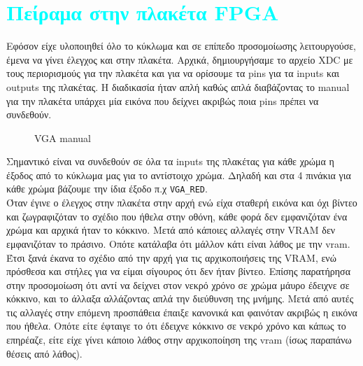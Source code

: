 \documentclass[12pt,a4paper]{article}
\begin{document}
	\section{\textcolor{cyan}{Πείραμα στην πλακέτα FPGA}}
	
	Εφόσον είχε υλοποιηθεί όλο το κύκλωμα και σε επίπεδο προσομοίωσης λειτουργούσε, έμενα να γίνει έλεγχος και στην πλακέτα. Αρχικά, δημιουργήσαμε το αρχείο XDC με τους περιορισμούς για την πλακέτα και για να ορίσουμε τα pins για τα inputs και outputs της πλακέτας. Η διαδικασία ήταν απλή καθώς απλά διαβάζοντας το manual για την πλακέτα υπάρχει μία εικόνα που δείχνει ακριβώς ποια pins πρέπει να συνδεθούν.
	\begin{figure} [H]
		\caption{VGA manual}
		\label{VGA manual}
	\end{figure}
	Σημαντικό είναι να συνδεθούν σε όλα τα inputs της πλακέτας για κάθε χρώμα η έξοδος από το κύκλωμα μας για το αντίστοιχο χρώμα. Δηλαδή και στα 4 πινάκια για κάθε χρώμα βάζουμε την ίδια έξοδο π.χ \verb*|VGA_RED|.\\
	Όταν έγινε ο έλεγχος στην πλακέτα στην αρχή ενώ είχα σταθερή εικόνα και όχι βίντεο και ζωγραφιζόταν το σχέδιο που ήθελα στην οθόνη, κάθε φορά δεν εμφανιζόταν ένα χρώμα και αρχικά ήταν το κόκκινο. Μετά από κάποιες αλλαγές στην VRAM δεν εμφανιζόταν το πράσινο. Οπότε κατάλαβα ότι μάλλον κάτι είναι λάθος με την vram. Έτσι ξανά έκανα το σχέδιο από την αρχή για τις αρχικοποιήσεις της VRAM, ενώ πρόσθεσα και στήλες για να είμαι σίγουρος ότι δεν ήταν βίντεο. Επίσης παρατήρησα στην προσομοίωση ότι αντί να δείχνει στον νεκρό χρόνο σε χρώμα μάυρο έδειχνε σε κόκκινο, και το άλλαξα αλλάζοντας απλά την διεύθυνση της μνήμης. Μετά από αυτές τις αλλαγές στην επόμενη προσπάθεια έπαιξε κανονικά και φαινόταν ακριβώς η εικόνα που ήθελα. Οπότε είτε έφταιγε το ότι έδειχνε κόκκινο σε νεκρό χρόνο και κάπως το επηρέαζε, είτε είχε γίνει κάποιο λάθος στην αρχικοποίηση της vram (ίσως παραπάνω θέσεις από λάθος).\\
\end{document}
